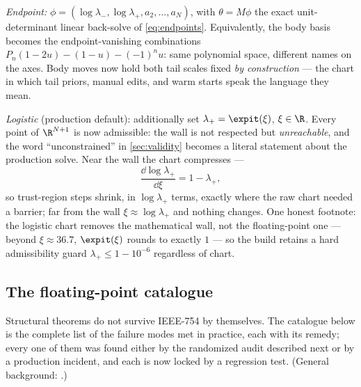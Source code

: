 \emph{Endpoint:} $\phi=(\log\lambda_-,\log\lambda_+,a_2,\dots,a_N)$, with
$\theta=M\phi$ the exact unit-determinant linear back-solve of
\eqref{eq:endpoints}.  Equivalently, the body basis becomes the
endpoint-vanishing combinations $P_n(1-2u)-(1-u)-(-1)^{n}u$: same
polynomial space, different names on the axes.  Body moves now hold both
tail scales fixed \emph{by construction} --- the chart in which tail
priors, manual edits, and warm starts speak the language they mean.

\emph{Logistic} (production default): additionally set
$\lambda_+=\expit(\xi)$, $\xi\in\R$.  Every point of $\R^{N+1}$ is now
admissible: the wall is not respected but \emph{unreachable}, and the
word ``unconstrained'' in \cref{sec:validity} becomes a literal statement
about the production solve.  Near the wall the chart compresses ---
\begin{equation}
\frac{\dd\log\lambda_+}{\dd\xi}=1-\lambda_+ ,
\label{eq:chartcompression}
\end{equation}
so trust-region steps shrink, in $\log\lambda_+$ terms, exactly where the
raw chart needed a barrier; far from the wall $\xi\approx\log\lambda_+$
and nothing changes.  One honest footnote: the logistic chart removes the
mathematical wall, not the floating-point one --- beyond
$\xi\approx36.7$, $\expit(\xi)$ rounds to exactly $1$ --- so the build
retains a hard admissibility guard $\lambda_+\le1-10^{-6}$ regardless of
chart.

\subsection{The floating-point catalogue}

Structural theorems do not survive IEEE-754 by themselves.  The
catalogue below is the complete list of the failure modes met in
practice, each with its remedy; every one of them was found either by
the randomized audit described next or by a production incident, and
each is now locked by a regression test.  (General background:
\citealp{Higham2002}.)

